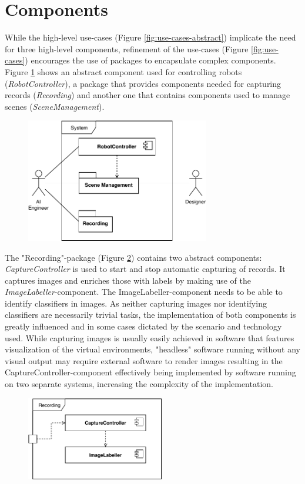 \section{Components}
While the high-level use-cases (Figure \ref{fig:use-cases-abstract}) implicate the need for three high-level components, refinement of the use-cases (Figure \ref{fig:use-cases}) encourages the use of packages to encapsulate complex components. Figure \ref{fig:component-diagram} shows an abstract component used for controlling robots (\emph{RobotController}), a package that provides components needed for capturing records (\emph{Recording}) and another one that contains components used to manage scenes (\emph{SceneManagement}).
\begin{figure}[b]
    \centering
    \includegraphics[width=8cm]{tex/img/ch04/ComponentDiagram_System.pdf}
    \label{fig:component-diagram}
\end{figure}
The "Recording"-package (Figure \ref{fig:component-diagram-recording}) contains two abstract components: \emph{CaptureController} is used to start and stop automatic capturing of records. It captures images and enriches those with labels by making use of the \emph{ImageLabeller}-component. The ImageLabeller-component needs to be able to identify classifiers in images. As neither capturing images nor identifying classifiers are necessarily trivial tasks, the implementation of both components is greatly influenced and in some cases dictated by the scenario and technology used. While capturing images is usually easily achieved in software that features visualization of the virtual environments, "headless" software running without any visual output may require external software to render images resulting in the CaptureController-component effectively being implemented by software running on two separate systems, increasing the complexity of the implementation.
\begin{figure}[b]
    \centering
    \includegraphics[width=6cm]{tex/img/ch04/ComponentDiagram_Recording.pdf}
    \label{fig:component-diagram-recording}
\end{figure}
